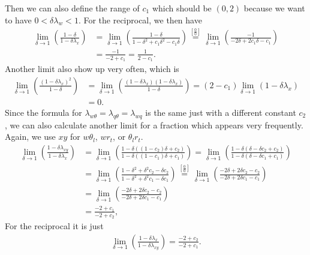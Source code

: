 Then we can also define the range of $c_1$ which should be $(0, 2)$ because we want to have $0 < \delta\lambda_w < 1$.
For the reciprocal, we then have
\begin{align}
    \lim_{\delta \to 1} \left(\frac{1 - \delta}{1 - \delta\lambda_x}\right)
    &= \lim_{\delta \to 1} \left(\frac{1 - \delta}{1 - \delta^2 + c_1\delta^2 - c_1\delta}\right)
    \overset{\left[\frac{0}{0}\right]}{=} \lim_{\delta \to 1} \left(\frac{-1}{- 2\delta + 2c_1\delta - c_1}\right) \\
    &= \frac{-1}{-2 + c_1} = \frac{1}{2 - c_1}.
\end{align}
Another limit also show up very often, which is
\begin{align}
    \lim_{\delta \to 1} \left(\frac{(1 - \delta\lambda_x)^2}{1 - \delta}\right)
    &= \lim_{\delta \to 1} \left(\frac{(1 - \delta\lambda_x) (1 - \delta\lambda_x)}{1 - \delta}\right)
    = (2 - c_1) \lim_{\delta \to 1} (1 - \delta\lambda_x) \\
    &= 0.
\end{align}
Since the formula for $\lambda_{w\theta} = \lambda_{q\theta} = \lambda_{wq}$ is the same just with a different constant $c_2$,
we can also calculate another limit for a fraction which appears very frequently.
Again, we use $xy$ for $w\theta_l$, $wr_t$, or $\theta_l r_t$.
\begin{align}
    \lim_{\delta \to 1} \left(\frac{1 - \delta \lambda_{xy}}{1 - \delta \lambda_x}\right)
    &= \lim_{\delta \to 1} \left(\frac{1 - \delta ((1 - c_2) \delta + c_2)}{1 - \delta ((1 - c_1) \delta + c_1)}\right)
    = \lim_{\delta \to 1} \left(\frac{1 - \delta (\delta - \delta c_2 + c_2)}{1 - \delta (\delta - \delta c_1 + c_1)}\right) \\
    &= \lim_{\delta \to 1} \left(\frac{1 - \delta^2 + \delta^2 c_2 - \delta c_2}{1 - \delta^2 + \delta^2 c_1 - \delta c_1}\right)
    \overset{\left[\frac{0}{0}\right]}{=}
    \lim_{\delta \to 1} \left(\frac{- 2\delta + 2\delta c_2 - c_2}{- 2\delta + 2\delta c_1 - c_1}\right) \\
    &= \lim_{\delta \to 1} \left(\frac{- 2\delta + 2\delta c_2 - c_2}{- 2\delta + 2\delta c_1 - c_1}\right) \\
    &= \frac{-2 + c_1}{-2 + c_2},
\end{align}
For the reciprocal it is just
\begin{align}
    \lim_{\delta \to 1} \left(\frac{1 - \delta \lambda_x}{1 - \delta \lambda_{xy}}\right) = \frac{-2 + c_2}{-2 + c_1}.
\end{align}

